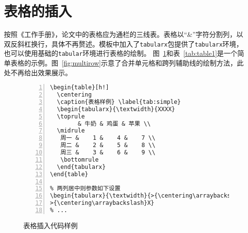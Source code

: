 %
%
%
%
%
%
%

\section{表格的插入}
按照《工作手册》，论文中的表格应为通栏的三线表。表格以``\&''字符分割列，以双反斜杠换行，具体不再赘述。模板中加入了\texttt{tabularx}包提供了\texttt{tabularx}环境，也可以使用基础的\texttt{tabular}环境进行表格的绘制。
图~\ref{fig:table1}和表~\ref{tab:table1}是一个简单表格的示例。图~\ref{fig:multirow}示意了合并单元格和跨列辅助线的绘制方法，此处不再给出效果展示。


\begin{figure}[h]
  {
  \fontsize{10pt}{12pt}\selectfont
  \setmainfont{Courier New}
  \begin{lstlisting}[showstringspaces=false,numbers=left,xleftmargin=3em]
\begin{table}[h!]
  \centering
  \caption{表格样例} \label{tab:simple}
  \begin{tabularx}{\textwidth}{XXXX}
  \toprule
        & 牛奶 & 鸡蛋 & 苹果 \\
  \midrule
   周一 &    1 &    4 &    7 \\
   周二 &    2 &    5 &    8 \\
   周三 &    3 &    6 &    9 \\
   \bottomrule
  \end{tabularx}
\end{table}

% 两列居中则参数如下设置
\begin{tabularx}{\textwidth}{>{\centering\arraybackslash}X
>{\centering\arraybackslash}X}
% ...
  \end{lstlisting}
  }
\caption{表格插入代码样例}
\label{fig:table1}
\end{figure}

